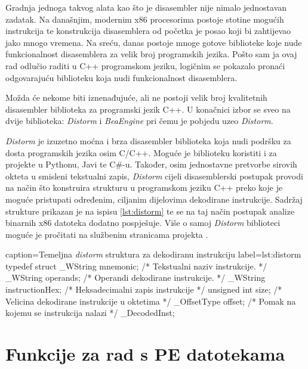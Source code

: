 \documentclass[times, utf8, diplomski, numeric]{fer}
\begin{document}
Gradnja jednoga takvog alata kao što je disasembler nije nimalo
jednostavan zadatak. Na današnjim, modernim x86 procesorima
postoje stotine mogućih instrukcija te konstrukcija disasemblera
od početka je posao koji bi zahtijevao jako mnogo vremena. Na
sreću, danas postoje mnoge gotove biblioteke koje nude
funkcionalnost disasemblera za velik broj programskih jezika.
Pošto sam ja ovaj rad odlučio raditi u C++ programskom jeziku,
logičnim se pokazalo pronaći odgovarajuću biblioteku koja nudi
funkcionalnost disasemblera.

Možda će nekome biti iznenađujuće, ali ne postoji velik broj
kvalitetnih disasembler biblioteka za programski jezik C++. U
konačnici izbor se sveo na dvije biblioteka:					%
\emph{Distorm}\citep{distorm} i
\emph{BeaEngine}\citep{bea_engine} pri čemu je pobjedu uzeo			%
\emph{Distorm}.

\emph{Distorm} je izuzetno moćna i brza disasembler biblioteka
koja nudi podršku za dosta programskih jezika osim C/C++. Moguće		%
je biblioteku koristiti i za projekte u Pythonu, Javi te C\#-u.
Također, osim jednostavne pretvorbe sirovih okteta u smisleni
tekstualni zapis, \emph{Distorm} cijeli disasemblerski postupak			%
provodi na način što konstruira strukturu u programskom jeziku
C++ preko koje je moguće pristupati određenim, ciljanim
dijelovima dekodirane instrukcije. Sadržaj strukture prikazan je
na ispisu \ref{lst:distorm} te se na taj način postupak
analize binarnih x86 datoteka dodatno pospješuje. Više o samoj
\emph{Distorm} biblioteci moguće je pročitati na službenim
stranicama projekta \citep{distorm}. 						%

\begin{struktura} {caption=Temeljna \emph{distorm} struktura za dekodiranu instrukciju} {label=lst:distorm}
typedef struct {
	_WString mnemonic; /* Tekstualni naziv instrukcije. */
	_WString operands; /* Operandi dekodirane instrukcije. */
	_WString instructionHex; /* Heksadecimalni zapis instrukcije */
	unsigned int size; /* Velicina dekodirane instrukcije u oktetima */
	_OffsetType offset; /* Pomak na kojemu se instrukcija nalazi */
} _DecodedInst;
\end{struktura}

\section{Funkcije za rad s PE datotekama}
\end{document}
